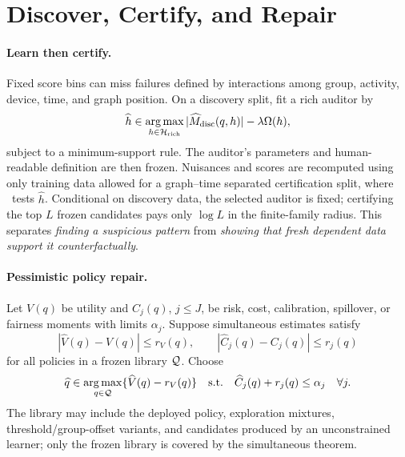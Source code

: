 \section{Discover, Certify, and Repair}
\label{sec:discover-repair}

\paragraph{Learn then certify.}
Fixed score bins can miss failures defined by interactions among group, activity, device, time, and graph position. On a discovery split, fit a rich auditor by
\begin{equation}
\widehat h\in\operatorname*{arg\,max}_{h\in\mathcal{H}_{\rm rich}}
|\widehat M_{\rm disc}(q,h)|-\lambda\Omega(h),
\label{eq:auditor-learning}
\end{equation}
subject to a minimum-support rule. The auditor's parameters and human-readable definition are then frozen. Nuisances and scores are recomputed using only training data allowed for a graph--time separated certification split, where \COMET\ tests $\widehat h$. Conditional on discovery data, the selected auditor is fixed; certifying the top $L$ frozen candidates pays only $\log L$ in the finite-family radius. This separates \emph{finding a suspicious pattern} from \emph{showing that fresh dependent data support it counterfactually}.

\paragraph{Pessimistic policy repair.}
Let $V(q)$ be utility and $C_j(q)$, $j\le J$, be risk, cost, calibration, spillover, or fairness moments with limits $\alpha_j$. Suppose simultaneous estimates satisfy
\begin{equation}
|\widehat V(q)-V(q)|\le r_V(q),\qquad
|\widehat C_j(q)-C_j(q)|\le r_j(q)
\label{eq:sim-policy-event}
\end{equation}
for all policies in a frozen library $\mathcal{Q}$. Choose
\begin{equation}
\widehat q\in\operatorname*{arg\,max}_{q\in\mathcal{Q}}\{\widehat V(q)-r_V(q)\}
\quad\text{s.t.}\quad
\widehat C_j(q)+r_j(q)\le\alpha_j\quad\forall j.
\label{eq:policy-repair}
\end{equation}
The library may include the deployed policy, exploration mixtures, threshold/group-offset variants, and candidates produced by an unconstrained learner; only the frozen library is covered by the simultaneous theorem.

